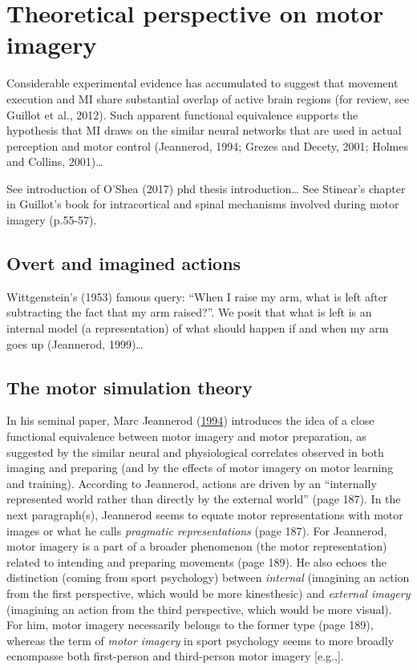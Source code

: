 \documentclass[a4paper,12pt,twoside,openright,oldfontcommands]{memoir}
\begin{document}
\section{Theoretical perspective on motor
imagery}\label{theoretical-perspective-on-motor-imagery}

Considerable experimental evidence has accumulated to suggest that
movement execution and MI share substantial overlap of active brain
regions (for review, see Guillot et al., 2012). Such apparent functional
equivalence supports the hypothesis that MI draws on the similar neural
networks that are used in actual perception and motor control
(Jeannerod, 1994; Grezes and Decety, 2001; Holmes and Collins,
2001)\ldots{}

See introduction of O'Shea (2017) phd thesis introduction\ldots{} See
Stinear's chapter in Guillot's book for intracortical and spinal
mechanisms involved during motor imagery (p.55-57).

\subsection{Overt and imagined
actions}\label{overt-and-imagined-actions}

Wittgenstein's (1953) famous query: ``When I raise my arm, what is left
after subtracting the fact that my arm raised?''. We posit that what is
left is an internal model (a representation) of what should happen if
and when my arm goes up (Jeannerod, 1999)\ldots{}

\subsection{The motor simulation
theory}\label{the-motor-simulation-theory}

In his seminal paper, Marc Jeannerod
(\protect\hyperlink{ref-jeannerod_representing_1994}{1994}) introduces
the idea of a close functional equivalence between motor imagery and
motor preparation, as suggested by the similar neural and physiological
correlates observed in both imaging and preparing (and by the effects of
motor imagery on motor learning and training). According to Jeannerod,
actions are driven by an ``internally represented world rather than
directly by the external world'' (page 187). In the next paragraph(s),
Jeannerod seems to equate motor representations with motor images or
what he calls \emph{pragmatic representations} (page 187). For
Jeannerod, motor imagery is a part of a broader phenomenon (the motor
representation) related to intending and preparing movements (page 189).
He also echoes the distinction (coming from sport psychology) between
\emph{internal} (imagining an action from the first perspective, which
would be more kinesthesic) and \emph{external imagery} (imagining an
action from the third perspective, which would be more visual). For him,
motor imagery necessarily belongs to the former type (page 189), whereas
the term of \emph{motor imagery} in sport psychology seems to more
broadly ecnompasse both first-person and third-person motor imagery
{[}e.g.,{]}.
\end{document}
